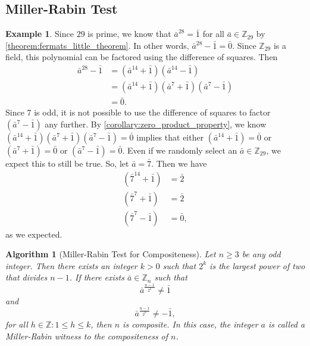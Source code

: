 \documentclass[12pt, titlepage]{amsart}
\newcommand\Z{{\mathbb Z}}
\newtheorem{algorithm}{Algorithm}[subsection]
\theoremstyle{definition}
\newtheorem{example}{Example}[subsection]
\begin{document}
	\subsection{Miller-Rabin Test}

	\begin{example}\label{example:miller-rabin_prime_modulus}
		Since $29$ is prime, we know that $\bar{a}^{28} = \bar{1}$ for all $\bar{a} \in \Z_{29}$ by \cref{theorem:fermats_little_theorem}. 
		In other words, $\bar{a}^{28}-\bar{1}=\bar{0}$.
		Since $\Z_{29}$ is a field, this polynomial can be factored using the difference of squares.
		Then
		\begin{align*}
		\bar{a}^{28}-\bar{1}
		&= (\bar{a}^{14}+\bar{1})(\bar{a}^{14}-\bar{1}) \\
		&= (\bar{a}^{14}+\bar{1})(\bar{a}^{7}+\bar{1})(\bar{a}^{7}-\bar{1}) \\
		&= \bar{0}.
		\end{align*}
		Since 7 is odd, it is not possible to use the difference of squares to factor $(\bar{a}^{7}-\bar{1})$ any further.
		By \cref{corollary:zero_product_property}, we know $(\bar{a}^{14}+\bar{1})(\bar{a}^{7}+\bar{1})(\bar{a}^{7}-\bar{1}) = \bar{0}$ implies that either $(\bar{a}^{14}+\bar{1})=\bar{0}$ or $(\bar{a}^{7}+\bar{1})=\bar{0}$ or $(\bar{a}^{7}-\bar{1})=\bar{0}$.
		Even if we randomly select an $\bar{a} \in \Z_{29}$, we expect this to still be true.
		So, let $\bar{a} = \bar{7}$.
		Then we have
		\begin{align*}
		(\bar{7}^{14}+\bar{1})&=\bar{2} \\
		(\bar{7}^{7}+\bar{1})&=\bar{2} \\
		(\bar{7}^{7}-\bar{1})&=\bar{0},
		\end{align*}
		as we expected.	
	\end{example}

	\begin{algorithm}[Miller-Rabin Test for Compositeness]\label{algorithm:miller-rabin}
		Let $n \geq 3$ be any odd integer. 
		Then there exists an integer $k > 0$ such that $2^k$ is the largest power of two that divides $n-1$.
		If there exists $\bar{a} \in \Z_n$ such that  
		$$\bar{a}^{\frac{n-1}{2^k}} \neq \bar{1}$$ and 
		$$\bar{a}^{\frac{n-1}{2^h}} \neq -\bar{1},$$ 
		for all $h \in \Z : 1 \leq h \leq k$, then $n$ is composite. 
		In this case, the integer $a$ is called a Miller-Rabin witness to the compositeness of $n$.
	\end{algorithm}
	
\end{document}
